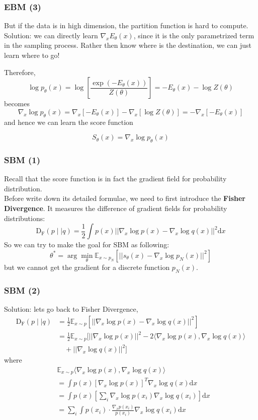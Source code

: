 \documentclass{beamer}
\begin{document}
\begin{frame}[t]
\frametitle{EBM (3)}
But if the data is in high dimension, the partition function is hard to compute.\\
Solution: we can directly learn $\nabla_xE_\theta(x)$, since it is the only parametrized term in the sampling process. Rather then know where is the destination, we can just learn where to go!

Therefore,
$$
\log p_\theta(x)=\log\left[\frac{\exp(-E_\theta(x))}{Z(\theta)}\right]=-E_\theta(x)-\log Z(\theta)
$$
becomes
$$
\nabla_x\log p_\theta(x)=\nabla_x[-E_\theta(x)]-\nabla_x[\log Z(\theta)]=-\nabla_x[-E_\theta(x)]
$$
and hence we can learn the score function
\begin{tcolorbox}[colback=blue!1!white,
                  colframe=blue!75!black]
$$
S_\theta(x)=\nabla_x\log p_\theta(x)
$$
\end{tcolorbox}
\end{frame}

\begin{frame}[t]
\frametitle{SBM (1)}
Recall that the score function is in fact the gradient field for probability distribution.\\
Before write down its detailed formulae, we need to first introduce the \textbf{Fisher Divergence}. It measures the difference of gradient fields for probability distributions:
$$
\mathrm{D_F}(p\mid\mid q)=\frac{1}{2}\int p(x)||\nabla_x\log p(x)-\nabla_x\log q(x)||^2\text{d}x
$$
So we can try to make the goal for SBM as following:
$$
\theta^*=\arg\min_\theta\mathbb{E}_{x\sim p_N}[||s_\theta(x)-\nabla_x\log p_N(x)||^2]
$$
but we cannot get the gradient for a discrete function $p_N(x)$.
\end{frame}

\begin{frame}[t]
\frametitle{SBM (2)}
Solution: lets go back to Fisher Divergence,
\begin{align*}
    \mathrm{D_F}(p\mid\mid q)&=\frac{1}{2}\mathbb{E}_{x\sim p}\left[||\nabla_x\log p(x)-\nabla_x\log q(x)||^2\right]\\
    &=\frac{1}{2}\mathbb{E}_{x\sim p}[||\nabla_x\log p(x)||^2-2\langle \nabla_x\log p(x), \nabla_x\log q(x)\rangle\\&\quad+||\nabla_x\log q(x)||^2 ]\tag{\#}
\end{align*}
where
\begin{align*}
&\mathbb{E}_{x\sim p}\langle \nabla_x\log p(x), \nabla_x\log q(x)\rangle\\&=\int p(x)[\nabla_x\log p(x)]^T\nabla_x\log q(x)\text{d}x\\
&=\int p(x)\left[\sum_i \nabla_x\log p(x_i)\nabla_x\log q(x_i)\right]\text{d}x\\
&=\sum_i\int p(x_i)\cdot \frac{\nabla_x p(x_i)}{p(x_i)}\nabla_x\log q(x_i)\text{d}x
\end{align*}
\end{frame}
\end{document}
